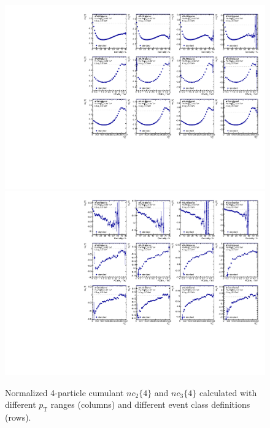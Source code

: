 \begin{figure}[H]
\centering
\includegraphics[width=.95\linewidth]{figs/sec_result/forQM/phy_nc4_Har2.pdf}
\includegraphics[width=.95\linewidth]{figs/sec_result/forQM/phy_nc4_Har3.pdf}
\caption{Normalized 4-particle cumulant $nc_2\{4\}$ and $nc_3\{4\}$ calculated with different $p_\text{T}$ ranges (columns) and different event class definitions (rows).}
\label{fig:result_phy_nc4_Har23}
\end{figure}
